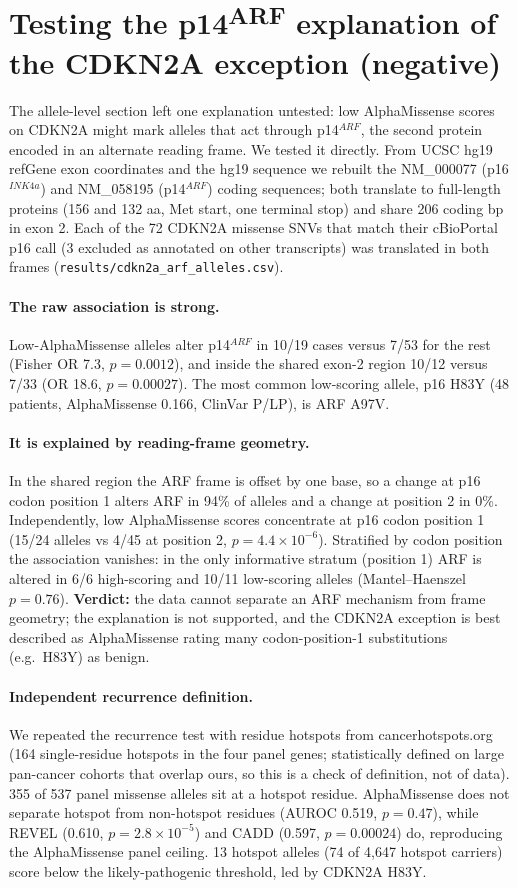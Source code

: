 \section{Testing the p14\textsuperscript{ARF} explanation of the CDKN2A exception (negative)}
The allele-level section left one explanation untested: low AlphaMissense
scores on CDKN2A might mark alleles that act through p14$^{ARF}$, the second
protein encoded in an alternate reading frame. We tested it directly. From UCSC
hg19 refGene exon coordinates and the hg19 sequence we rebuilt the NM\_000077
(p16$^{INK4a}$) and NM\_058195 (p14$^{ARF}$) coding sequences; both translate
to full-length proteins (156 and 132 aa, Met start, one terminal stop)
and share 206 coding bp in exon 2. Each of the 72 CDKN2A missense SNVs that
match their cBioPortal p16 call (3 excluded as annotated on other
transcripts) was translated in both frames (\texttt{results/cdkn2a\_arf\_alleles.csv}).

\paragraph{The raw association is strong.} Low-AlphaMissense alleles alter
p14$^{ARF}$ in 10/19 cases versus 7/53 for the rest (Fisher OR 7.3,
$p=0.0012$), and inside the shared exon-2 region 10/12 versus 7/33 (OR 18.6,
$p=0.00027$). The most common low-scoring allele, p16 H83Y (48 patients,
AlphaMissense 0.166, ClinVar P/LP), is ARF A97V.

\paragraph{It is explained by reading-frame geometry.} In the shared region
the ARF frame is offset by one base, so a change at p16 codon position 1 alters
ARF in 94\% of alleles and a change at position 2 in 0\%.
Independently, low AlphaMissense scores concentrate at p16 codon position 1
(15/24 alleles vs 4/45 at position 2, $p=4.4\times10^{-6}$). Stratified by codon
position the association vanishes: in the only informative stratum (position
1) ARF is altered in 6/6 high-scoring and 10/11 low-scoring alleles
(Mantel--Haenszel $p=0.76$). \textbf{Verdict:} the data cannot separate an ARF
mechanism from frame geometry; the explanation is not supported, and the
CDKN2A exception is best described as AlphaMissense rating many
codon-position-1 substitutions (e.g.\ H83Y) as benign.

\paragraph{Independent recurrence definition.} We repeated the recurrence test
with residue hotspots from cancerhotspots.org (164 single-residue hotspots in
the four panel genes; statistically defined on large pan-cancer cohorts that
overlap ours, so this is a check of definition, not of data). 355 of 537
panel missense alleles sit at a hotspot residue. AlphaMissense does not
separate hotspot from non-hotspot residues (AUROC 0.519, $p=0.47$), while
REVEL (0.610, $p=2.8\times10^{-5}$) and CADD (0.597, $p=0.00024$) do, reproducing the
AlphaMissense panel ceiling. 13 hotspot alleles (74 of 4,647 hotspot
carriers) score below the likely-pathogenic threshold, led by CDKN2A H83Y.

